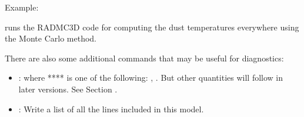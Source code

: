 \documentclass[letterpaper,10pt,english]{sphinxmanual}
\begin{document}
Example:

\begin{sphinxVerbatim}[commandchars=\\\{\}]
 
\end{sphinxVerbatim}

runs the RADMC\sphinxhyphen{}3D code for computing the dust temperatures everywhere using the
Monte Carlo method.

There are also some additional commands that may be useful for diagnostics:
\begin{itemize}
\item {} 
: where **** is one of the following:
, . But other
quantities will follow in later versions. See Section {\hyperref[\detokenize{toolsinside:sec-subbox}]{}}.

\item {} 
: Write a list of all the lines included in
this model.

\end{itemize}
\end{document}
